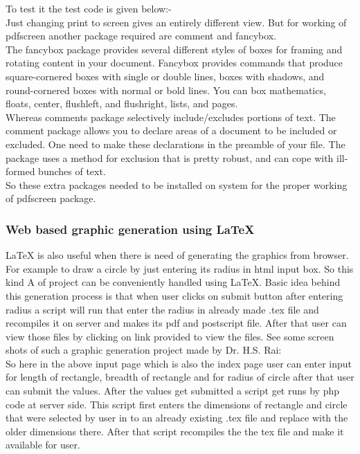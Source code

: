 \noindent To test it the test code is given below:-\\
Just changing print to screen gives an entirely different view. But for working of pdfscreen another package required are comment and fancybox.\\

\noindent The fancybox package provides several different styles of boxes for framing and rotating content in your document. Fancybox provides commands that produce square-cornered boxes with single or double lines, boxes with shadows, and round-cornered boxes with normal or bold lines. You can box mathematics, floats, center, flushleft, and flushright, lists, and pages.\\
 	
\noindent Whereas comments package selectively include/excludes portions of text. The comment package allows you to declare areas of a document to be included or excluded. One need to make these declarations in the preamble of your file. The package uses a method for exclusion that is pretty robust, and can cope with ill-formed bunches of text.\\

\noindent So these extra packages needed to be installed on system for the proper working of pdfscreen package.
\subsubsection{Web based graphic generation using \LaTeX{}}
\LaTeX{} is also useful when there is need of generating the graphics from browser. For
example to draw a circle by just entering its radius in html input box. So this kind
A
of project can be conveniently handled using \LaTeX{}. Basic idea behind this generation
process is that when user clicks on submit button after entering radius a script will run
that enter the radius in already made .tex file and recompiles it on server and makes its
pdf and postscript file. After that user can view those files by clicking on link provided
to view the files. See some screen shots of such a graphic generation project made by
Dr. H.S. Rai:\\
So here in the above input page which is also the index page user can enter input
for length of rectangle, breadth of rectangle and for radius of circle after that user can submit the values. After the values get submitted a script get runs by php code at server
side. This script first enters the dimensions of rectangle and circle that were selected by
user in to an already existing .tex file and replace with the older dimensions there. After
that script recompiles the the tex file and make it available for user.\\
	
